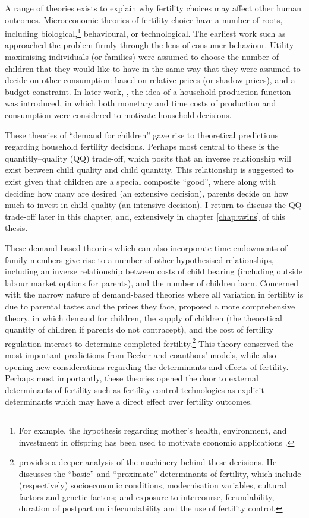 A range of theories exists to explain why fertility choices may affect other 
human outcomes.  Microeconomic theories of fertility choice have a number of
roots, including biological,\footnote{For example, the \citet{TriversWillard1973}
hypothesis regarding mother's health, environment, and investment in offspring
has been used to motivate economic applications \citep{AlmondEdlund2007}.}
behavioural, or technological. The earliest work such as \citet{Becker1960} 
approached the problem firmly through the lens of consumer behaviour.  Utility 
maximising individuals (or families) were assumed to choose the number of 
children that they would like to have in the same way that they were assumed to 
decide on other consumption: based on relative prices (or shadow prices), and a 
budget constraint.  In later work, \citep{Becker1965}, the idea of a household 
production function was introduced, in which both monetary and time costs of 
production and consumption were considered to motivate household decisions.

These theories of ``demand for children'' gave rise to theoretical predictions 
regarding household fertility decisions.  Perhaps most central to these is the
quantitly--quality (QQ) trade-off, which posits that an inverse relationship
will exist between child quality and child quantity.  This relationship is
suggested to exist given that children are a special composite ``good'', where 
along with deciding how many are desired (an extensive decision), parents decide 
on how much to invest in child quality (an intensive decision).  I return to 
discuss the QQ trade-off later in this chapter, and, extensively in chapter
\ref{chap:twins} of this thesis.

These demand-based theories which can also incorporate time endowments of 
family members give rise to a number of other hypothesised relationships, 
including an inverse relationship between costs of child bearing (including 
outside labour market options for parents), and the number of children born.  
Concerned with the narrow nature of demand-based theories where all variation 
in fertility is due to parental tastes and the prices they face, 
\citet{Easterlin1975} proposed a more comprehensive theory, in which demand for 
children, the supply of children (the theoretical quantity of children if 
parents do not contracept), and the cost of fertility regulation interact to 
determine completed fertility.\footnote{\citeauthor{Easterlin1975} provides a 
deeper analysis of the machinery behind these decisions.  He discusses the 
``basic'' and ``proximate'' determinants of fertility, which include 
(respectively) socioeconomic conditions, modernisation variables, cultural 
factors and genetic factors; and exposure to intercourse, fecundability, 
duration of postpartum infecundability and the use of fertility control.} This 
theory conserved the most important predictions from Becker and coauthors' 
models, while also opening new considerations regarding the determinants and 
effects of fertility.  Perhaps most importantly, these theories opened the 
door to external determinants of fertility such as fertility control 
technologies as explicit determinants which may have a direct effect over 
fertility outcomes.

